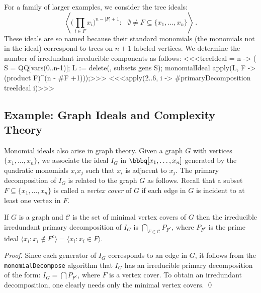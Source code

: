 For a family of larger examples, we consider the tree
ideals:
\[
\left\langle \big({\textstyle \prod_{i \in F}} x_{i}\big)^{n-|F|+1} :
\text{ $\emptyset \neq F \subseteq \{ x_{1}, \dotsc, x_{n} \}$}
\right\rangle \, .
\]
These ideals are so named because their standard monomials (the
monomials not in the ideal) correspond to trees on $n+1$ labeled
vertices.  We determine the number of irredundant irreducible
components as follows:
<<<treeIdeal = n -> (
     S = QQ[vars(0..n-1)];
     L := delete({}, subsets gens S);
     monomialIdeal apply(L, F -> (product F)^(n - #F +1)));>>>
<<<apply(2..6, i -> #primaryDecomposition treeIdeal i)>>>


\subsection*{Example: Graph Ideals and Complexity Theory}

Monomial ideals also arise in graph theory.  Given a graph $G$ with
vertices $\{x_{1}, \dotsc, x_{n}\}$, we associate the
ideal $I_{G}$ in $\bbbq[x_{1}, \dotsc, x_{n}]$
generated by the quadratic monomials $x_{i}x_{j}$ such that $x_{i}$ is
adjacent to $x_{j}$.  The primary decomposition of $I_{G}$ is related to
the graph $G$ as follows.  Recall that a subset $F \subseteq \{x_{1},
\dotsc, x_{n}\}$ is called a {\em vertex cover} of $G$ if each edge in $G$ is incident to at least
one vertex in $F$.

\begin{lemma} \label{lem:graphideal}
If $G$ is a graph and $\mathcal{C}$ is the set of minimal vertex
covers of $G$ then the irreducible irredundant primary
decomposition of $I_{G}$ is $\bigcap_{F
\in \mathcal{C}} P_{F^{c}}$, where $P_{F^{c}}$ is the prime ideal
$\langle x_{i} : x_{i} \not\in F^{c} \rangle =
\langle x_{i} : x_{i} \in F \rangle$.
\end{lemma}

\begin{proof}
Since each generator of $I_{G}$ corresponds to an edge in $G$, it
follows from the {\tt monomialDecompose} algorithm that $I_{G}$ has an
irreducible primary decomposition of the form: $I_{G} = \bigcap
P_{F^{c}}$, where $F$ is a vertex cover.  To obtain an
irredundant decomposition, one clearly needs only the minimal vertex
covers. \qed
\end{proof}

